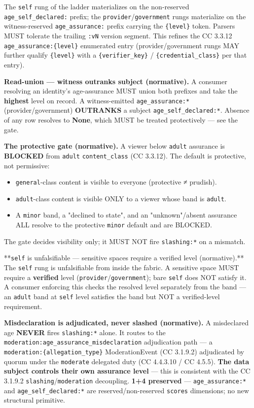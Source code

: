 \documentclass[11pt]{article}
\begin{document}
The \texttt{self} rung of the ladder materializes on the non-reserved \texttt{age\_self\_declared:} prefix; the \texttt{provider}/\texttt{government} rungs materialize on the witness-reserved \texttt{age\_assurance:} prefix carrying the \texttt{\{level\}} token. Parsers MUST tolerate the trailing \texttt{:vN} version segment. This refines the CC 3.3.12 \texttt{age\_assurance:\{level\}} enumerated entry (provider/government rungs MAY further qualify \texttt{\{level\}} with a \texttt{\{verifier\_key\}} / \texttt{\{credential\_class\}} per that entry).


\textbf{Read-union — witness outranks subject (normative).} A consumer resolving an identity's age-assurance MUST union both prefixes and take the \textbf{highest} level on record. A witness-emitted \texttt{age\_assurance:*} (provider/government) \textbf{OUTRANKS} a subject \texttt{age\_self\_declared:*}. Absence of any row resolves to \textbf{None}, which MUST be treated protectively — see the gate.


\textbf{The protective gate (normative).} A viewer below \texttt{adult} assurance is \textbf{BLOCKED} from \texttt{adult} \texttt{content\_class} (CC 3.3.12). The default is protective, not permissive:


\begin{itemize}\setlength\itemsep{0pt}
\item \texttt{general}-class content is visible to everyone (protective ≠ prudish).
\item \texttt{adult}-class content is visible ONLY to a viewer whose band is \texttt{adult}.
\item A \texttt{minor} band, a "declined to state", and an "unknown"/absent assurance ALL resolve to the protective \texttt{minor} default and are BLOCKED.
\end{itemize}


The gate decides visibility only; it MUST NOT fire \texttt{slashing:*} on a mismatch.


**\texttt{self} is unfalsifiable — sensitive spaces require a verified level (normative).** The \texttt{self} rung is unfalsifiable from inside the fabric. A sensitive space MUST require a \textbf{verified} level (\texttt{provider}/\texttt{government}); bare \texttt{self} does NOT satisfy it. A consumer enforcing this checks the resolved level separately from the band — an \texttt{adult} band at \texttt{self} level satisfies the band but NOT a verified-level requirement.


\textbf{Misdeclaration is adjudicated, never slashed (normative).} A misdeclared age \textbf{NEVER} fires \texttt{slashing:*} alone. It routes to the \texttt{moderation:age\_assurance\_misdeclaration} adjudication path — a \texttt{moderation:\{allegation\_type\}} ModerationEvent (CC 3.1.9.2) adjudicated by quorum under the \texttt{moderate} delegated duty (CC 4.4.3.10 / CC 4.5.5). \textbf{The data subject controls their own assurance level} — this is consistent with the CC 3.1.9.2 \texttt{slashing}/\texttt{moderation} decoupling. \textbf{1+4 preserved} — \texttt{age\_assurance:*} and \texttt{age\_self\_declared:*} are reserved/non-reserved \texttt{scores} dimensions; no new structural primitive.
\end{document}
